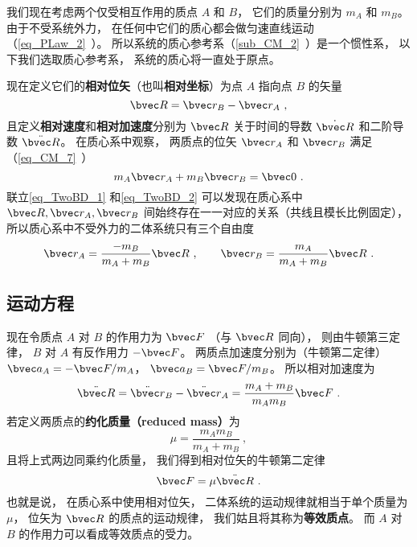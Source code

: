 

我们现在考虑两个仅受相互作用的质点 $A$ 和 $B$， 它们的质量分别为 $m_A$ 和 $m_B$。 由于不受系统外力， 在任何中它们的质心都会做匀速直线运动（\autoref{eq_PLaw_2}~）。 所以系统的质心参考系（\autoref{sub_CM_2}~）是一个惯性系， 以下我们选取质心参考系， 系统的质心将一直处于原点。

现在定义它们的\textbf{相对位矢}（也叫\textbf{相对坐标}）为点 $A$ 指向点 $B$ 的矢量
\begin{equation}\label{eq_TwoBD_1}
\bvec R = \bvec r_B - \bvec r_A~,
\end{equation}
且定义\textbf{相对速度}和\textbf{相对加速度}分别为 $\bvec R$ 关于时间的导数 $\dot{\bvec R}$ 和二阶导数 $\ddot{\bvec R}$。
在质心系中观察， 两质点的位矢 $\bvec r_A$ 和 $\bvec r_B$ 满足（\autoref{eq_CM_7}~）
\begin{equation}\label{eq_TwoBD_2}
m_A \bvec r_A + m_B \bvec r_B = \bvec 0~.
\end{equation}
联立\autoref{eq_TwoBD_1} 和\autoref{eq_TwoBD_2} 可以发现在质心系中 $\bvec R, \bvec r_A, \bvec r_B$ 间始终存在一一对应的关系（共线且模长比例固定）， 所以质心系中不受外力的二体系统只有三个自由度
\begin{equation}\label{eq_TwoBD_3}
\bvec r_A = \frac{-m_B}{m_A + m_B} \bvec R ~,\qquad
\bvec r_B = \frac{m_A}{m_A + m_B} \bvec R~.
\end{equation}

\subsection{运动方程}

现在令质点 $A$ 对 $B$ 的作用力为 $\bvec F$ （与 $\bvec R$ 同向）， 则由牛顿第三定律， $B$ 对 $A$ 有反作用力 $- \bvec F$。 两质点加速度分别为（牛顿第二定律） $\bvec a_A =  -\bvec F/m_A$， $\bvec a_B =  \bvec F/m_B$。 所以相对加速度为
\begin{equation}
\ddot{\bvec R} = \ddot{\bvec r}_B - \ddot{\bvec r}_A = \frac{m_A+m_B}{m_Am_B} \bvec F~.
\end{equation}
若定义两质点的\textbf{约化质量（reduced mass）}为
\begin{equation}
\mu = \frac{m_A m_B}{m_A + m_B}~,
\end{equation}
且将上式两边同乘约化质量， 我们得到相对位矢的牛顿第二定律
\begin{equation}\label{eq_TwoBD_6}
\bvec F = \mu\ddot{\bvec R}~.
\end{equation}
也就是说， 在质心系中使用相对位矢， 二体系统的运动规律就相当于单个质量为 $\mu$， 位矢为 $\bvec R$ 的质点的运动规律， 我们姑且将其称为\textbf{等效质点}。 而 $A$ 对 $B$ 的作用力可以看成等效质点的受力。

